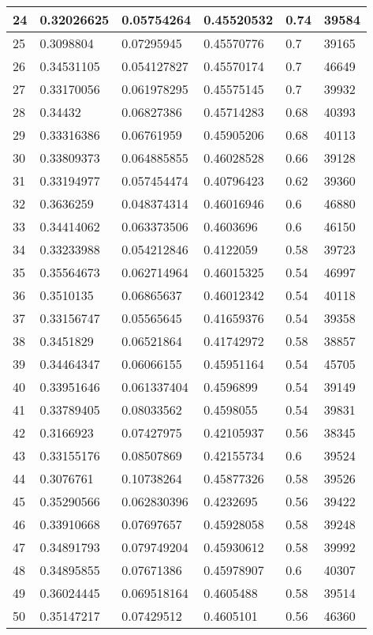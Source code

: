 \begin{longtable}{|l|l|l|l|l|l|}
24 & 0.32026625 & 0.05754264 & 0.45520532 & 0.74 & 39584 \\ \hline 
25 & 0.3098804 & 0.07295945 & 0.45570776 & 0.7 & 39165 \\ \hline 
26 & 0.34531105 & 0.054127827 & 0.45570174 & 0.7 & 46649 \\ \hline 
27 & 0.33170056 & 0.061978295 & 0.45575145 & 0.7 & 39932 \\ \hline 
28 & 0.34432 & 0.06827386 & 0.45714283 & 0.68 & 40393 \\ \hline 
29 & 0.33316386 & 0.06761959 & 0.45905206 & 0.68 & 40113 \\ \hline 
30 & 0.33809373 & 0.064885855 & 0.46028528 & 0.66 & 39128 \\ \hline 
31 & 0.33194977 & 0.057454474 & 0.40796423 & 0.62 & 39360 \\ \hline 
32 & 0.3636259 & 0.048374314 & 0.46016946 & 0.6 & 46880 \\ \hline 
33 & 0.34414062 & 0.063373506 & 0.4603696 & 0.6 & 46150 \\ \hline 
34 & 0.33233988 & 0.054212846 & 0.4122059 & 0.58 & 39723 \\ \hline 
35 & 0.35564673 & 0.062714964 & 0.46015325 & 0.54 & 46997 \\ \hline 
36 & 0.3510135 & 0.06865637 & 0.46012342 & 0.54 & 40118 \\ \hline 
37 & 0.33156747 & 0.05565645 & 0.41659376 & 0.54 & 39358 \\ \hline 
38 & 0.3451829 & 0.06521864 & 0.41742972 & 0.58 & 38857 \\ \hline 
39 & 0.34464347 & 0.06066155 & 0.45951164 & 0.54 & 45705 \\ \hline 
40 & 0.33951646 & 0.061337404 & 0.4596899 & 0.54 & 39149 \\ \hline 
41 & 0.33789405 & 0.08033562 & 0.4598055 & 0.54 & 39831 \\ \hline 
42 & 0.3166923 & 0.07427975 & 0.42105937 & 0.56 & 38345 \\ \hline 
43 & 0.33155176 & 0.08507869 & 0.42155734 & 0.6 & 39524 \\ \hline 
44 & 0.3076761 & 0.10738264 & 0.45877326 & 0.58 & 39526 \\ \hline 
45 & 0.35290566 & 0.062830396 & 0.4232695 & 0.56 & 39422 \\ \hline 
46 & 0.33910668 & 0.07697657 & 0.45928058 & 0.58 & 39248 \\ \hline 
47 & 0.34891793 & 0.079749204 & 0.45930612 & 0.58 & 39992 \\ \hline 
48 & 0.34895855 & 0.07671386 & 0.45978907 & 0.6 & 40307 \\ \hline 
49 & 0.36024445 & 0.069518164 & 0.4605488 & 0.58 & 39514 \\ \hline 
50 & 0.35147217 & 0.07429512 & 0.4605101 & 0.56 & 46360 \\ \hline 
\end{longtable}